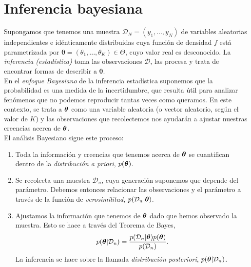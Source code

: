 \section{Inferencia bayesiana}

Supongamos que tenemos una muestra $\mathcal D_N = \left(y_1,...,y_N\right)$ de variables aleatorias independientes e idénticamente distribuidas 
cuya función de densidad $f$ está parametrizada por $\boldsymbol{\theta} = (\theta_1,...,\theta_K) \in \Theta$, cuyo valor real es desconocido. 
La \textit{inferencia (estadística)} toma las observaciones $\mathcal D$, las procesa y trata de encontrar formas de describir a $\boldsymbol{\theta}$. \\

En el \textit{enfoque Bayesiano} de la inferencia estadística suponemos que la probabilidad es una medida de la incertidumbre, que resulta útil para analizar fenómenos que no podemos reproducir tantas veces como queramos. En este contexto, se trata a $\boldsymbol{\theta}$ como una variable aleatoria (o vector aleatorio, según el valor de $K$) y las observaciones que recolectemos nos ayudarán a ajustar nuestras creencias acerca de $\boldsymbol{\theta}$.\\

El análisis Bayesiano sigue este proceso: 

\begin{enumerate}
    \item Toda la información y creencias que tenemos acerca de $\boldsymbol{\theta}$ se cuantifican dentro de la \textit{distribución a priori}, $p(\boldsymbol{\theta})$.
    \item Se recolecta una muestra $\mathcal D_n$, cuya generación suponemos que depende del parámetro. Debemos entonces relacionar las observaciones y el parámetro a través de la función de \textit{verosimilitud}, $p(\mathcal D_n|\boldsymbol{\theta})$.
    \item Ajustamos la información que tenemos de $\boldsymbol{\theta}$ dado que hemos observado la muestra. Esto se hace a través del Teorema de Bayes,
    $$p(\boldsymbol{\theta}|\mathcal D_n) = \frac{p(\mathcal D_n|\boldsymbol{\theta})p(\boldsymbol{\theta})}{p(\mathcal D_n)}.$$
    La inferencia se hace sobre la llamada \textit{distribución posteriori}, $p(\boldsymbol{\theta}|\mathcal D_n)$.
\end{enumerate}




